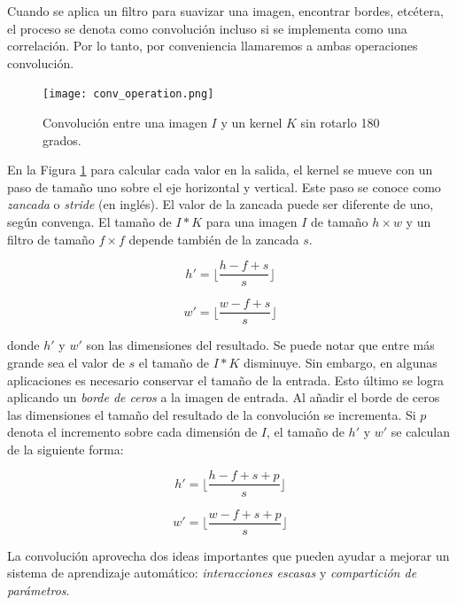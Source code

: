 Cuando se aplica un filtro para suavizar una imagen, encontrar bordes, etcétera, el 
proceso se denota como convolución incluso si se implementa como una correlación. Por
lo tanto, por conveniencia llamaremos a ambas operaciones convolución.

\begin{figure}[htbp]
    \centering
    \texttt{[image: conv\_operation.png]}
    \caption{Convolución entre una imagen
    $I$ y un kernel $K$ sin rotarlo 180 grados.}
    \label{fig:convolution_example}
\end{figure}

En la Figura \ref{fig:convolution_example} para calcular
cada valor en la salida, el kernel se mueve con un paso 
de tamaño uno sobre el eje horizontal y vertical. Este paso
se conoce como \textit{zancada} o \textit{stride} (en inglés).
El valor de la zancada puede ser diferente de uno, según 
convenga. El tamaño de $I * K$ para una imagen $I$ de tamaño
$h \times w$ y un filtro de tamaño $f \times f$ depende también de
la zancada $s$.

\[
h' = \lfloor\frac{h-f+s}{s}\rfloor
\]

\[
w' = \lfloor\frac{w-f+s}{s}\rfloor
\]

donde $h'$ y $w'$ son las dimensiones del resultado.
Se puede notar que entre más grande sea el valor de $s$
el tamaño de $I * K$ disminuye. Sin embargo, en algunas 
aplicaciones es necesario conservar el tamaño de la entrada.
Esto último se logra aplicando un \textit{borde de ceros}
a la imagen de entrada. Al añadir el borde de ceros las
dimensiones el tamaño del resultado de la convolución se 
incrementa. Si $p$ denota el incremento sobre cada dimensión
de $I$, el tamaño de $h'$ y $w'$ se calculan de la siguiente 
forma:


\[
h' = \lfloor\frac{h-f+s+p}{s}\rfloor
\]

\[
w' = \lfloor\frac{w-f+s+p}{s}\rfloor
\]


La convolución aprovecha dos ideas importantes que pueden ayudar a mejorar un
sistema de aprendizaje automático: \textit{interacciones escasas} y \textit{compartición de parámetros}.

